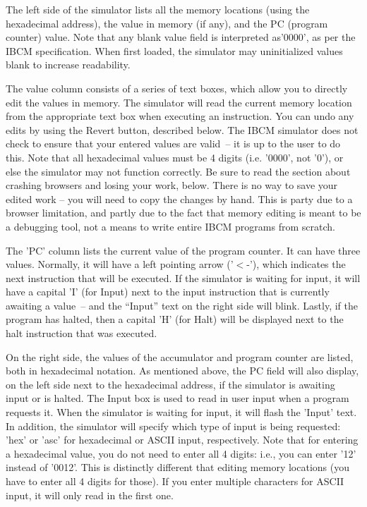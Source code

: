 The left side of the simulator lists all the memory locations (using
the hexadecimal address), the value in memory (if any), and the PC
(program counter) value. Note that any blank value field is
interpreted as'0000', as per the IBCM specification. When first
loaded, the simulator may uninitialized values blank to increase
readability.

The value column consists of a series of text boxes, which allow you
to directly edit the values in memory. The simulator will read the
current memory location from the appropriate text box when executing an
instruction. You can undo any edits by using the Revert button,
described below. The IBCM simulator does not check to ensure that your
entered values are valid~-- it is up to the user to do this. Note that
all hexadecimal values must be 4 digits (i.e. '0000', not '0'), or
else the simulator may not function correctly. Be sure to read the
section about crashing browsers and losing your work, below. There is
no way to save your edited work -- you will need to copy the changes
by hand. This is party due to a browser limitation, and partly due to
the fact that memory editing is meant to be a debugging tool, not a
means to write entire IBCM programs from scratch.

The 'PC' column lists the current value of the program counter. It can
have three values. Normally, it will have a left pointing arrow
('$<$-'), which indicates the next instruction that will be executed.
If the simulator is waiting for input, it will have a capital 'I' (for
Input) next to the input instruction that is currently awaiting a
value~-- and the ``Input'' text on the right side will blink. Lastly,
if the program has halted, then a capital 'H' (for Halt) will be
displayed next to the halt instruction that was executed.

On the right side, the values of the accumulator and program counter
are listed, both in hexadecimal notation. As mentioned above, the PC
field will also display, on the left side next to the hexadecimal
address, if the simulator is awaiting input or is halted. The Input
box is used to read in user input when a program requests it. When the
simulator is waiting for input, it will flash the 'Input' text. In
addition, the simulator will specify which type of input is being
requested: 'hex' or 'asc' for hexadecimal or ASCII input,
respectively. Note that for entering a hexadecimal value, you do not
need to enter all 4 digits: i.e., you can enter '12' instead of
'0012'. This is distinctly different that editing memory locations
(you have to enter all 4 digits for those). If you enter multiple
characters for ASCII input, it will only read in the first one.

